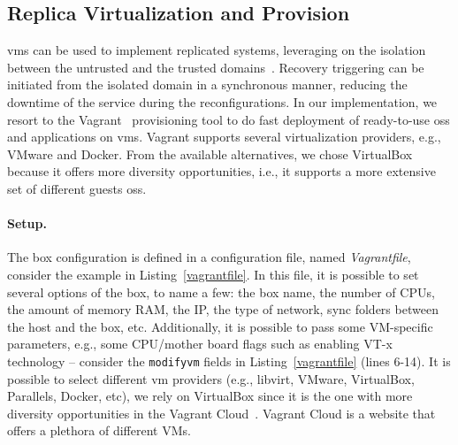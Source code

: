 

\subsection{Replica Virtualization and Provision}
\glspl{vm} can be used to implement replicated systems, leveraging on the isolation between the untrusted and the trusted domains~\cite{Sousa:2010,Platania:2014,Distler:2011,Dettoni:2013}.
Recovery triggering can be initiated from the isolated domain in a synchronous manner, reducing the downtime of the service during the reconfigurations. 
In our implementation, we resort to the Vagrant~\cite{vagrant} provisioning tool to do fast deployment of ready-to-use \glspl{os} and applications on \glspl{vm}. 
Vagrant supports several virtualization providers, e.g., VMware and Docker. 
From the available alternatives, we chose VirtualBox~\cite{virtualbox} because it offers more diversity opportunities, i.e., it supports a more extensive set of different guests \glspl{os}.

\paragraph{Setup.}
The box configuration is defined in a configuration file, named \emph{Vagrantfile}, consider the example in Listing~\ref{vagrantfile}.
In this file, it is possible to set several options of the box, to name a few:
the box name, the number of CPUs, the amount of memory RAM, the IP, the type of network, sync folders between the host and the box, etc. 
Additionally, it is possible to pass some VM-specific parameters, e.g., some CPU/mother board flags such as enabling VT-x technology -- consider the \texttt{modifyvm} fields in Listing~\ref{vagrantfile} (lines 6-14).
It is possible to select different \gls{vm} providers (e.g., libvirt, VMware, VirtualBox, Parallels, Docker, etc), we rely on VirtualBox since it is the one with more diversity opportunities in the Vagrant Cloud~\cite{vagrantcloud}. 
Vagrant Cloud is a website that offers a plethora of different VMs.

